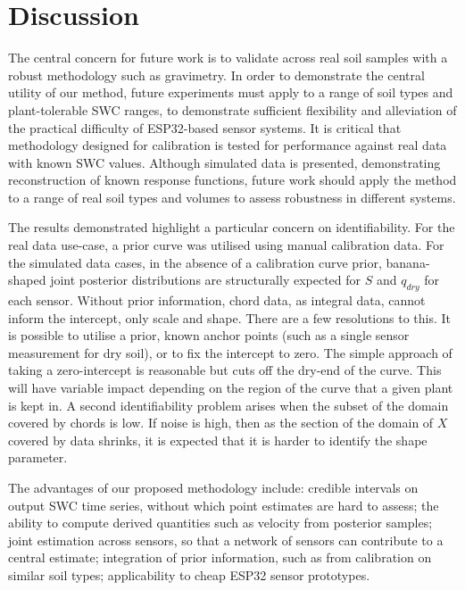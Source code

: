 \documentclass[11pt]{article}
\begin{document}
\section{Discussion}

The central concern for future work is to validate across real soil samples with a robust methodology such as gravimetry. In order to demonstrate the central utility of our method,
future experiments must apply to a range of soil types and plant-tolerable SWC ranges, to demonstrate sufficient flexibility and alleviation of the practical difficulty of
ESP32-based sensor systems.
It is critical that methodology designed for calibration is tested for performance against real data with known SWC values. Although simulated data is presented,
demonstrating reconstruction of known response functions, future work should apply the method to a range of real soil types and volumes to assess robustness in different systems.

The results demonstrated highlight a particular concern on identifiability. For the real data use-case, a prior curve was utilised using manual calibration data. 
For the simulated data cases, in the absence of a calibration curve prior, banana-shaped joint posterior distributions are structurally expected for $S$ and $q_{dry}$ for each sensor.
Without prior information, chord data, as integral data, cannot inform the intercept, only scale and shape. There are a few resolutions to this. It is possible to utilise a prior,
 known anchor points (such as a single sensor measurement for dry soil), or to fix the intercept to zero.
The simple approach of taking a zero-intercept is reasonable but cuts off the dry-end of the curve. This will have variable impact
depending on the region of the curve that a given plant is kept in. A second identifiability problem arises when the subset of the domain covered by chords is low. If noise is high,
then as the section of the domain of $X$ covered by data shrinks, it is expected that it is harder to identify the shape parameter.

The advantages of our proposed methodology include: credible intervals on output SWC time series, without which point estimates are hard to assess; the ability to compute
derived quantities such as velocity from posterior samples; joint estimation across sensors, so that a network of sensors can contribute to a central estimate; 
integration of prior information, such as from calibration on similar soil types; applicability to cheap ESP32 sensor prototypes.
\end{document}

